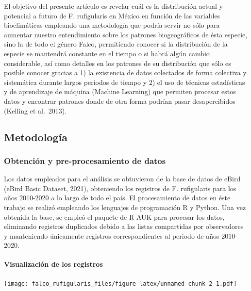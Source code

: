 \documentclass[
]{article}
\begin{document}
El objetivo del presente artículo es revelar cuál es la distribución
actual y potencial a futuro de F. rufigularis en México en función de
las variables bioclimáticas empleando una metodología que podría servir
no sólo para aumentar nuestro entendimiento sobre los patrones
biogeográficos de ésta especie, sino la de todo el género Falco,
permitiendo conocer si la distribución de la especie se mantendrá
constante en el tiempo o si habrá algún cambio considerable, así como
detalles en los patrones de su distribución que sólo es posible conocer
gracias a 1) la existencia de datos colectados de forma colectiva y
sistemática durante largos periodos de tiempo y 2) el uso de técnicas
estadísticas y de aprendizaje de máquina (Machine Learning) que permiten
procesar estos datos y encontrar patrones donde de otra forma podrían
pasar desapercibidos (Kelling et al.~2013).

\hypertarget{metodologuxeda}{%
\subsection{Metodología}\label{metodologuxeda}}

\hypertarget{obtenciuxf3n-y-pre-procesamiento-de-datos}{%
\subsubsection{Obtención y pre-procesamiento de
datos}\label{obtenciuxf3n-y-pre-procesamiento-de-datos}}

Los datos empleados para el análisis se obtuvieron de la base de datos
de eBird (eBird Basic Dataset, 2021), obteniendo los registros de F.
rufigularis para los años 2010-2020 a lo largo de todo el país. El
procesamiento de datos en éste trabajo se realizó empleando los
lenguajes de programación R y Python. Una vez obtenida la base, se
empleó el paquete de R AUK para procesar los datos, eliminando registros
duplicados debido a las listas compartidas por observadores y
manteniendo únicamente registros correspondientes al periodo de años
2010-2020.

\hypertarget{visualizaciuxf3n-de-los-registros}{%
\paragraph{Visualización de los
registros}\label{visualizaciuxf3n-de-los-registros}}

\texttt{[image: falco\_rufigularis\_files/figure-latex/unnamed-chunk-2-1.pdf]}
\end{document}

